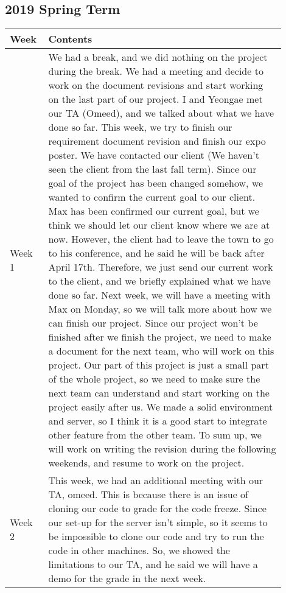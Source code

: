 \documentclass[10pt]{article}
\begin{document}
    \subsection{2019 Spring Term}
        \begin{center}
        \begin{tabular}{ | p{0.1\linewidth} | p{0.8\linewidth} | } \hline
            Week & Contents  \\ \hline  
            Week 1 & We had a break, and we did nothing on the project during the break.
            We had a meeting and decide to work on the document revisions and start working on the last part of our project.
            I and Yeongae met our TA (Omeed), and we talked about what we have done so far.
            This week, we try to finish our requirement document revision and finish our expo poster.
            We have contacted our client (We haven't seen the client from the last fall term).
            Since our goal of the project has been changed somehow, we wanted to confirm the current goal to our client.
            Max has been confirmed our current goal, but we think we should let our client know where we are at now.
            However, the client had to leave the town to go to his conference, and he said he will be back after April 17th.
            Therefore, we just send our current work to the client, and we briefly explained what we have done so far.
            Next week, we will have a meeting with Max on Monday, so we will talk more about how we can finish our project.
            Since our project won't be finished after we finish the project, we need to make a document for the next team, who will work on this project.
            Our part of this project is just a small part of the whole project, so we need to make sure the next team can understand and start working on the project easily after us.
            We made a solid environment and server, so I think it is a good start to integrate other feature from the other team.
            To sum up, we will work on writing the revision during the following weekends, and resume to work on the project.
               \\ \hline
            Week 2 & This week, we had an additional meeting with our TA, omeed.
            This is because there is an issue of cloning our code to grade for the code freeze.
            Since our set-up for the server isn't simple, so it seems to be impossible to clone our code and try to run the code in other machines.
            So, we showed the limitations to our TA, and he said we will have a demo for the grade in the next week.

\end{tabular}
\end{center}
\end{document}
